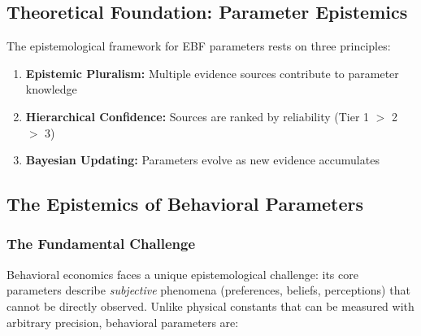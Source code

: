 \begin{abstract}
This appendix provides the methodological foundations for parameter estimation
in the EBF framework. We address the fundamental question: \textit{Where do
the numbers come from?} We present a three-tier hybrid estimation strategy that
integrates hard empirical data, meta-analytical calibration, and synthetic priors
from large language models. The appendix serves as the central ``Estimation Hub''
connecting Appendix AN (LLM Monte Carlo), Appendix E (Empirical Operationalization),
and Chapter 4 (Calibration).
\end{abstract}

\subsection{Theoretical Foundation: Parameter Epistemics}
\label{sec:BBB-theory}

The epistemological framework for EBF parameters rests on three principles:

\begin{enumerate}
    \item \textbf{Epistemic Pluralism:} Multiple evidence sources contribute to parameter knowledge
    \item \textbf{Hierarchical Confidence:} Sources are ranked by reliability (Tier 1 $>$ 2 $>$ 3)
    \item \textbf{Bayesian Updating:} Parameters evolve as new evidence accumulates
\end{enumerate}

\subsection{The Epistemics of Behavioral Parameters}
\label{sec:BBB-epistemics}

\subsubsection{The Fundamental Challenge}

Behavioral economics faces a unique epistemological challenge: its core parameters 
describe \textit{subjective} phenomena (preferences, beliefs, perceptions) that 
cannot be directly observed. Unlike physical constants that can be measured with 
arbitrary precision, behavioral parameters are:

